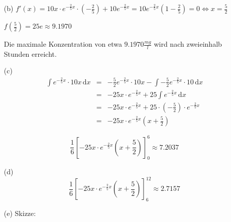 \documentclass[a4paper,11pt,fleqn]{scrartcl}
\newcommand{\bra}[1]{\left(#1\right)}
\newcommand{\dX}[1]{\, \mathrm{d}#1}
\newcommand{\dx}[0]{\dX{x}}
\begin{document}
\begin{enumerate}
\begin{enumerate}
            \item[(b)]
                \( f'(x) = 10x \cdot e^{-\frac{2}{5}x} \cdot \bra{-\frac{2}{5}} + 10 e^{-\frac{2}{5}x} = 10e^{-\frac{2}{5}x} \bra{1-\frac{2}{5}} = 0 \Leftrightarrow x = \frac{5}{2} \)

                \( f(\frac{5}{2}) =  25 e \approx 9.1970 \)

                Die maximale Konzentration von etwa $9.1970 \frac{mg}{l}$ wird nach zweieinhalb Stunden erreicht.

            \item[(c)]
                \begin{eqnarray*}
                    \int e^{-\frac{2}{5}x} \cdot 10x \dx &=& -\frac{5}{2} e^{-\frac{2}{5}x} \cdot 10x - \int -\frac{5}{2} e^{-\frac{2}{5}x} \cdot 10 \dx \\
                    &=& -25x \cdot e^{-\frac{2}{5}x} + 25 \int e^{-\frac{2}{5}x} \dx \\
                    &=& -25x \cdot e^{-\frac{2}{5}x} + 25 \cdot \bra{-\frac{5}{2}} \cdot e^{-\frac{2}{5}x} \\
                    &=& -25x \cdot e^{-\frac{2}{5}x} \bra{x+\frac{5}{2}}
                \end{eqnarray*}

                \[ \frac{1}{6} \left[ -25x \cdot e^{-\frac{2}{5}x} \bra{x+\frac{5}{2}} \right]_0^6 \approx 7.2037 \]

            \item[(d)]
                \[ \frac{1}{6} \left[ -25x \cdot e^{-\frac{2}{5}x} \bra{x+\frac{5}{2}} \right]_6^{12} \approx 2.7157 \]

            \item[(e)]
                Skizze:

\end{enumerate}
\end{enumerate}
\end{document}

